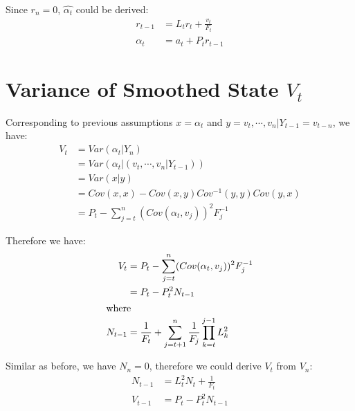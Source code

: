 \documentclass{article}
\begin{document}
\par\noindent
Since \(r_n = 0\), \(\hat{\alpha_t}\) could be derived:
\begin{align*}
    r_{t-1} &= L_tr_t + \frac{v_t}{F_t}\\
    \hat{\alpha_t} &= a_t  + P_tr_{t-1}
\end{align*}

\section{Variance of Smoothed State \(V_t\)}

Corresponding to previous assumptions \(x = \alpha_{t}\) and \(y = v_t, \cdots, v_n | Y_{t-1} = v_{t-n} \), we have:
\begin{align*}
    V_t &= Var(\alpha_{t}|Y_{n})\\
    &= Var(\alpha_{t} | (v_t, \cdots, v_n | Y_{t-1}))\\
    &= Var(x|y)\\
    &= Cov(x,x) - Cov(x,y)Cov^{-1}(y,y)Cov(y,x)\\
    &= P_t - \sum_{j=t}^{n}(Cov(\alpha_{t}, v_{j}))^2 F_{j}^{-1}
\end{align*}

\par\noindent
Therefore we have:
\begin{align*}
    V_t &= P_t - \sum_{j=t}^{n}(Cov(\alpha_{t}, v_{j}))^2 F_{j}^{-1}\\
    &= P_t - P_t^2N_{t-1}\\
\intertext{where} N_{t-1} &= \frac{1}{F_t} + \sum_{j=t+1}^{n}\frac{1}{F_{j}}\prod_{k=t}^{j-1}L_k^2
\end{align*}
\par\noindent
Similar as before, we have  \(N_n = 0\), therefore we could derive \(V_t\) from \(V_n\):
\begin{align*}
    N_{t-1} &= L_t^2N_t + \frac{1}{F_t}\\
    V_{t-1} &= P_t - P_t^2N_{t-1}
\end{align*}
\end{document}
